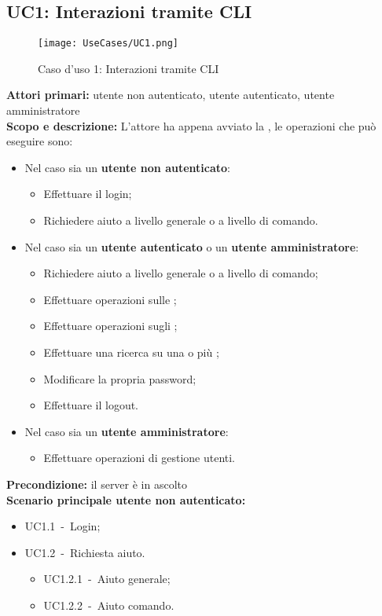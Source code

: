 \documentclass{scalatekids-article}
\begin{document}
\subsection{UC1: Interazioni tramite CLI}

\begin{figure}[H]
  \begin{center}
    \texttt{[image: UseCases/UC1.png]}
    \caption*{Caso d'uso 1: Interazioni tramite CLI}
  \end{center}
\end{figure}
\textbf{Attori primari:} utente non autenticato, utente autenticato, utente amministratore\\
\textbf{Scopo e descrizione:} L'attore ha appena avviato la , le operazioni che può eseguire sono:
\begin{itemize}
\item Nel caso sia un \textbf{utente non autenticato}:
  \begin{itemize}
  \item Effettuare il login;
  \item Richiedere aiuto a livello generale o a livello di comando.
  \end{itemize}
\item Nel caso sia un \textbf{utente autenticato} o un \textbf{utente amministratore}:
  \begin{itemize}
  \item Richiedere aiuto a livello generale o a livello di comando;
  \item Effettuare operazioni sulle ;
  \item Effettuare operazioni sugli ;
  \item Effettuare una ricerca su una o più ;
  \item Modificare la propria password;
  \item Effettuare il logout.
  \end{itemize}
\item Nel caso sia un \textbf{utente amministratore}:
  \begin{itemize}
  \item Effettuare operazioni di gestione utenti.
  \end{itemize}
\end{itemize}
\textbf{Precondizione:} il server è in ascolto\\
\textbf{Scenario principale utente non autenticato:}
\begin{itemize}
\item UC1.1\ -\ Login;
\item UC1.2\ -\ Richiesta aiuto.
  \begin{itemize}
  \item UC1.2.1\ -\ Aiuto generale;
  \item UC1.2.2\ -\ Aiuto comando.
  \end{itemize}
\end{itemize}
\end{document}
